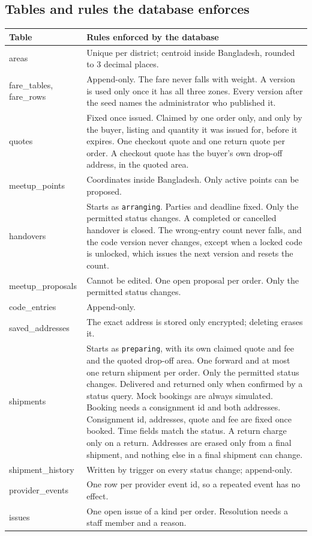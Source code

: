 \documentclass[11pt,a4paper]{article}
\newenvironment{dtable}[1]{\small\begin{longtable}{#1}}{\end{longtable}}
\begin{document}
\subsection{Tables and rules the database enforces}
\begin{dtable}{@{}>{\ttfamily\raggedright\arraybackslash}p{3.3cm}>{\raggedright\arraybackslash}p{11.9cm}@{}}
\toprule
\textnormal{\textbf{Table}} & \textbf{Rules enforced by the database} \\ \midrule \endhead
areas & Unique per district; centroid inside Bangladesh, rounded to 3 decimal places. \\
fare\_tables, fare\_rows & Append-only. The fare never falls with weight. A version is used only once it has all three zones. Every version after the seed names the administrator who published it. \\
quotes & Fixed once issued. Claimed by one order only, and only by the buyer, listing and quantity it was issued for, before it expires. One checkout quote and one return quote per order. A checkout quote has the buyer's own drop-off address, in the quoted area. \\
meetup\_points & Coordinates inside Bangladesh. Only active points can be proposed. \\
handovers & Starts as \texttt{arranging}. Parties and deadline fixed. Only the permitted status changes. A completed or cancelled handover is closed. The wrong-entry count never falls, and the code version never changes, except when a locked code is unlocked, which issues the next version and resets the count. \\
meetup\_proposals & Cannot be edited. One open proposal per order. Only the permitted status changes. \\
code\_entries & Append-only. \\
saved\_addresses & The exact address is stored only encrypted; deleting erases it. \\
shipments & Starts as \texttt{preparing}, with its own claimed quote and fee and the quoted drop-off area. One forward and at most one return shipment per order. Only the permitted status changes. Delivered and returned only when confirmed by a status query. Mock bookings are always simulated. Booking needs a consignment id and both addresses. Consignment id, addresses, quote and fee are fixed once booked. Time fields match the status. A return charge only on a return. Addresses are erased only from a final shipment, and nothing else in a final shipment can change. \\
shipment\_history & Written by trigger on every status change; append-only. \\
provider\_events & One row per provider event id, so a repeated event has no effect. \\
issues & One open issue of a kind per order. Resolution needs a staff member and a reason. \\
\bottomrule
\end{dtable}
\end{document}
